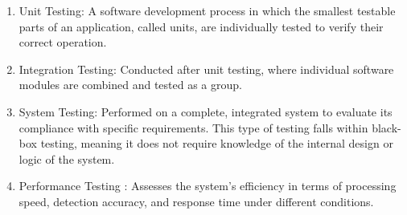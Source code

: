 \documentclass[11pt]{report}
\begin{document}
\begin{enumerate}
    \item Unit Testing: A software development process in which the smallest testable parts of an application, called units, are individually tested to verify their correct operation.

    \item Integration Testing: Conducted after unit testing, where individual software modules are combined and tested as a group.

    \item System Testing: Performed on a complete, integrated system to evaluate its compliance with specific requirements. This type of testing falls within black-box testing, meaning it does not require knowledge of the internal design or logic of the system.
    
    \item Performance Testing : Assesses the system’s efficiency in terms of processing speed, detection accuracy, and response time under different conditions.
\end{enumerate}
\end{document}
